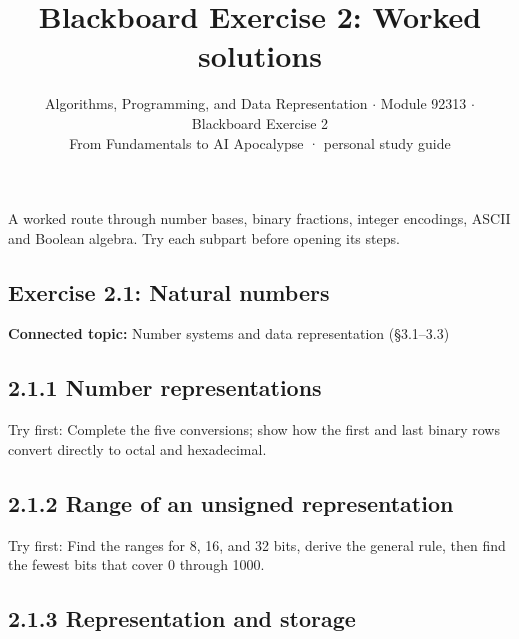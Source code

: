 \documentclass[11pt]{article}
\title{\sffamily\bfseries\color{FAUblue}Blackboard Exercise 2: Worked solutions}
\author{Algorithms, Programming, and Data Representation \ensuremath{\cdot} Module 92313 \ensuremath{\cdot} Blackboard Exercise 2\\[2pt]\small From Fundamentals to AI Apocalypse · personal study guide}
\date{}
\begin{document}
\maketitle
\begingroup\footnotesize\setlength{\parskip}{0pt}\tableofcontents\endgroup
\clearpage

{\large A worked route through number bases, binary fractions, integer encodings, ASCII and Boolean algebra. Try each subpart before opening its steps.}


\begin{keepsection}
\section{Exercise 2.1: Natural numbers}

\textbf{Connected topic:} Number systems and data representation (§3.1–3.3)

\begin{keepsection}
\subsection{2.1.1 Number representations}

Try first: Complete the five conversions; show how the first and last binary rows convert directly to octal and hexadecimal.

\end{keepsection}

\begin{keepsection}
\subsection{2.1.2 Range of an unsigned representation}

Try first: Find the ranges for 8, 16, and 32 bits, derive the general rule, then find the fewest bits that cover 0 through 1000.

\end{keepsection}

\begin{keepsection}
\subsection{2.1.3 Representation and storage}


\end{keepsection}
\end{keepsection}
\end{document}
